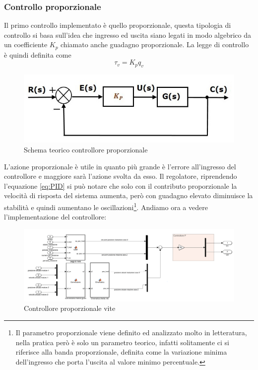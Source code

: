 \subsubsection{Controllo proporzionale}
Il primo controllo implementato è quello proporzionale, questa tipologia di controllo si basa sull'idea che ingresso ed uscita siano legati in modo algebrico da un coefficiente $K_p$ chiamato anche guadagno proporzionale. La legge di controllo è quindi definita come
\begin{equation}
\tau_v = K_p q_v
\end{equation}
\begin{figure}[ht]
	\begin{center}
		\includegraphics[scale=0.6]{Immagini/Controllori/Pschema}
		\caption{Schema teorico controllore proporzionale}
		\label{fig:Pschema}
	\end{center}
\end{figure}
L'azione proporzionale è utile in quanto più grande è l'errore all'ingresso del controllore e maggiore sarà l'azione svolta da esso. Il regolatore, riprendendo l'equazione \ref{eq:PID} si può notare che solo con il contributo proporzionale la velocità di risposta del sistema aumenta, però con guadagno elevato diminuisce la stabilità e quindi aumentano le oscillazioni\footnote{Il parametro proporzionale viene definito ed analizzato molto in letteratura, nella pratica però è solo un parametro teorico, infatti solitamente ci si riferisce alla banda proporzionale, definita come la variazione minima dell'ingresso che porta l'uscita al valore minimo percentuale.}.
Andiamo ora a vedere l'implementazione del controllore:
\begin{figure}[ht]
	\begin{center}
		\includegraphics[scale=0.37]{Immagini/Controllori/ViteP}
		\caption{Controllore proporzionale vite}
		\label{fig:PVite}
	\end{center}
\end{figure}
